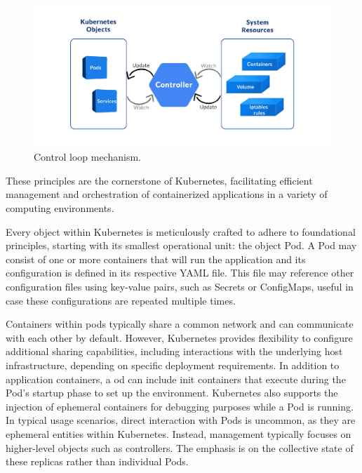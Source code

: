 \begin{figure}[ht]\centering
\includegraphics[scale=0.7]{Pictures/loop}
\caption[Control loop mechanism]{Control loop mechanism\footnotemark.}\label{fig:loop2}
\end{figure}

These principles are the cornerstone of Kubernetes, facilitating efficient management and orchestration of containerized applications in a variety of computing environments.


Every object within Kubernetes is meticulously crafted to adhere to foundational principles, starting with its smallest operational unit: the object Pod. A Pod may consist of one or more containers that will run the application and its configuration is defined in its respective YAML file. This file may reference other configuration files using key-value pairs, such as Secrets or ConfigMaps, useful in case these configurations are repeated multiple times. 

Containers within pods typically share a common network and can communicate with each other by default. However, Kubernetes provides flexibility to configure additional sharing capabilities, including interactions with the underlying host infrastructure, depending on specific deployment requirements. In addition to application containers, a od can include init containers that execute during the Pod's startup phase to set up the environment. Kubernetes also supports the injection of ephemeral containers for debugging purposes while a Pod is running. In typical usage scenarios, direct interaction with Pods is uncommon, as they are ephemeral entities within Kubernetes. Instead, management typically focuses on higher-level objects such as controllers. The emphasis is on the collective state of these replicas rather than individual Pods. 

